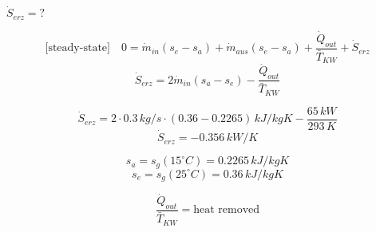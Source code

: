 \( \dot{S}_{erz} = ? \)  

\[ \text{[steady-state]} \quad 0 = \dot{m}_{in} (s_e - s_a) + \dot{m}_{aus} (s_e - s_a) + \frac{\dot{Q}_{out}}{\bar{T}_{KW}} + \dot{S}_{erz} \]  
\[ \dot{S}_{erz} = 2 \dot{m}_{in} (s_a - s_e) - \frac{\dot{Q}_{out}}{\bar{T}_{KW}} \]  

\[ \dot{S}_{erz} = 2 \cdot 0.3 \, kg/s \cdot (0.36 - 0.2265) \, kJ/kgK - \frac{65 \, kW}{293 \, K} \]  
\[ \dot{S}_{erz} = -0.356 \, kW/K \]  

\[ s_a = s_g(15^\circ C) = 0.2265 \, kJ/kgK \]  
\[ s_e = s_g(25^\circ C) = 0.36 \, kJ/kgK \]  

\[ \frac{\dot{Q}_{out}}{\bar{T}_{KW}} = \text{heat removed} \]